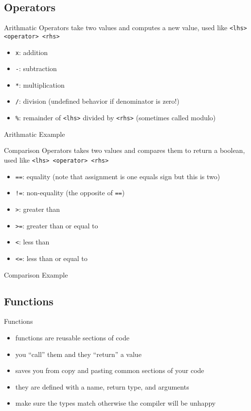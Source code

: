 \documentclass{beamer}
\newcommand{\examplefile}[1]{
	
}
\begin{document}
	\subsection{Operators}
	\begin{frame}[fragile]{Arithmatic Operators}
		take two values and computes a new value, used like \verb|<lhs> <operator> <rhs>|
		\begin{itemize}
			\item \verb|x|: addition
			\item \verb|-|: subtraction
			\item \verb|*|: multiplication
			\item \verb|/|: division (undefined behavior if denominator is zero!)
			\item \verb|%|: remainder of \verb|<lhs>| divided by \verb|<rhs>| (sometimes called modulo)
		\end{itemize}
	\end{frame}

	\begin{frame}[fragile]{Arithmatic Example}
		\examplefile{arithmatic.cxx}
	\end{frame}

	\begin{frame}[fragile]{Comparison Operators}
		takes two values and compares them to return a boolean, used like \verb|<lhs> <operator> <rhs>|
		\begin{itemize}
			\item \verb|==|: equality (note that assignment is one equals sign but this is two)
			\item \verb|!=|: non-equality (the opposite of \verb|==|)
			\item \verb|>|: greater than
			\item \verb|>=|: greater than or equal to
			\item \verb|<|: less than
			\item \verb|<=|: less than or equal to
		\end{itemize}
	\end{frame}

	\begin{frame}[fragile]{Comparison Example}
		\examplefile{comparison.cxx}
	\end{frame}

	\subsection{Functions}
	\begin{frame}{Functions}
		\begin{itemize}
			\item functions are reusable sections of code
			\item you ``call'' them and they ``return'' a value
			\item saves you from copy and pasting common sections of your code
			\item they are defined with a name, return type, and arguments
			\item make sure the types match otherwise the compiler will be unhappy
		\end{itemize}
	\end{frame}
\end{document}
